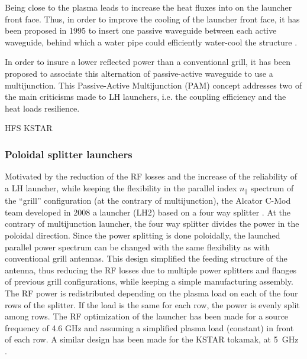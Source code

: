 {Being close to the plasma leads to increase the heat fluxes into on the launcher front face. Thus, in order to improve the cooling of the launcher front face, it has been proposed in 1995 to insert one passive waveguide between each active waveguide, behind which a water pipe could efficiently water-cool the structure . 

In order to insure a lower reflected power than a conventional grill, it has been proposed to associate this alternation of passive-active waveguide to  use a multijunction. This Passive-Active Multijunction (PAM) concept addresses two of the main criticisms made to LH launchers, i.e. the coupling efficiency and the heat loads resilience. 



HFS KSTAR


%
%
%

\subsubsection{Poloidal splitter launchers}
Motivated by the reduction of the RF losses and the increase of the reliability of a LH launcher, while keeping the flexibility in the parallel index $n_{\parallel}$ spectrum of the “grill” configuration (at the contrary of multijunction), the Alcator C-Mod team developed in 2008 a launcher (LH2) based on a four way splitter . At the contrary of multijunction launcher, the four way splitter divides the power in the poloidal direction. Since the power splitting is done poloidally, the launched parallel power spectrum can be changed with the same flexibility as with conventional grill antennas. This design simplified the feeding structure of the antenna, thus reducing the RF losses due to multiple power splitters and flanges of previous grill configurations, while keeping a simple manufacturing assembly. The RF power is redistributed depending on the plasma load on each of the four rows of the splitter. If the load is the same for each row, the power is evenly split among rows. The RF optimization of the launcher has been made for a source frequency of 4.6 GHz and assuming a simplified plasma load (constant) in front of each row. A similar design has been made for the KSTAR tokamak, at 5~GHz . 


}
